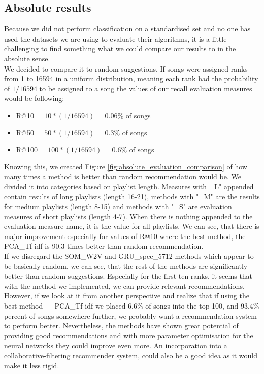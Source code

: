 \subsection{Absolute results}\label{ssec:absolute_results}
Because we did not perform classification on a standardised set and no one has used the datasets we are using to evaluate their algorithms, it is a little challenging to find something what we could compare our results to in the absolute sense. \\
We decided to compare it to random suggestions. If songs were assigned ranks from 1 to 16594 in a uniform distribution, meaning each rank had the probability of $1/16594$ to be assigned to a song the values of our recall evaluation measures would be following:
\begin{itemize}
    \item R@10 =  $ 10*(1/16594) $ = 0.06\% of songs
    \item R@50 = $ 50*(1/16594) $ = 0.3\% of songs
    \item R@100 = $ 100*(1/16594) $ = 0.6\% of songs
\end{itemize}

Knowing this, we created Figure \ref{fig:absolute_evaluation_comparison} of how many times a method is better than random recommendation would be. We divided it into categories based on playlist length. Measures with \_L" appended contain results of long playlists (length 16-21), methods with "\_M" are the results for medium playlists (length 8-15) and methods with "\_S" are evaluation measures of short playlists (length 4-7). When there is nothing appended to the evaluation measure name, it is the value for all playlists. We can see, that there is major improvement especially for values of R@10 where the best method, the PCA\_Tf-idf is 90.3 times better than random recommendation. \\
If we disregard the SOM\_W2V and GRU\_spec\_5712 methods which appear to be basically random, we can see, that the rest of the methods are significantly better than random suggestions. Especially for the first ten ranks, it seems that with the method we implemented, we can provide relevant recommendations. \\
However, if we look at it from another perspective and realize that if using the best method --- PCA\_Tf-idf we placed 6.6\% of songs into the top 100, and 93.4\% percent of songs somewhere further, we probably want a recommendation system to perform better. Nevertheless, the methods have shown great potential of providing good recommendations and with more parameter optimisation for the neural networks they could improve even more. An incorporation into a collaborative-filtering recommender system, could also be a good idea as it would make it less rigid.

